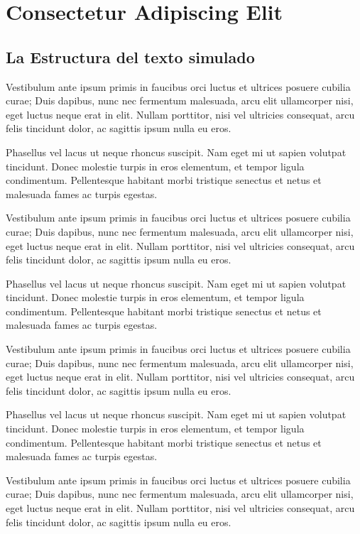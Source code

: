 \chapter{Consectetur Adipiscing Elit}
\setcounter{PrimPag}{\theCurrentPage}

\section{La Estructura del texto simulado}

Vestibulum ante ipsum primis in faucibus orci luctus et ultrices posuere cubilia curae; Duis dapibus, nunc nec fermentum malesuada, arcu elit ullamcorper nisi, eget luctus neque erat in elit. Nullam porttitor, nisi vel ultricies consequat, arcu felis tincidunt dolor, ac sagittis ipsum nulla eu eros.

Phasellus vel lacus ut neque rhoncus suscipit. Nam eget mi ut sapien volutpat tincidunt. Donec molestie turpis in eros elementum, et tempor ligula condimentum. Pellentesque habitant morbi tristique senectus et netus et malesuada fames ac turpis egestas.

Vestibulum ante ipsum primis in faucibus orci luctus et ultrices posuere cubilia curae; Duis dapibus, nunc nec fermentum malesuada, arcu elit ullamcorper nisi, eget luctus neque erat in elit. Nullam porttitor, nisi vel ultricies consequat, arcu felis tincidunt dolor, ac sagittis ipsum nulla eu eros.

Phasellus vel lacus ut neque rhoncus suscipit. Nam eget mi ut sapien volutpat tincidunt. Donec molestie turpis in eros elementum, et tempor ligula condimentum. Pellentesque habitant morbi tristique senectus et netus et malesuada fames ac turpis egestas.

Vestibulum ante ipsum primis in faucibus orci luctus et ultrices posuere cubilia curae; Duis dapibus, nunc nec fermentum malesuada, arcu elit ullamcorper nisi, eget luctus neque erat in elit. Nullam porttitor, nisi vel ultricies consequat, arcu felis tincidunt dolor, ac sagittis ipsum nulla eu eros.

Phasellus vel lacus ut neque rhoncus suscipit. Nam eget mi ut sapien volutpat tincidunt. Donec molestie turpis in eros elementum, et tempor ligula condimentum. Pellentesque habitant morbi tristique senectus et netus et malesuada fames ac turpis egestas.

Vestibulum ante ipsum primis in faucibus orci luctus et ultrices posuere cubilia curae; Duis dapibus, nunc nec fermentum malesuada, arcu elit ullamcorper nisi, eget luctus neque erat in elit. Nullam porttitor, nisi vel ultricies consequat, arcu felis tincidunt dolor, ac sagittis ipsum nulla eu eros.

